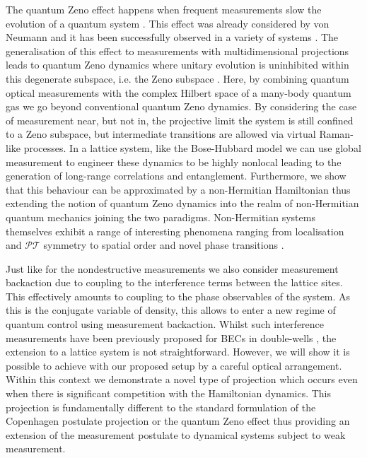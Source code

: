 The quantum Zeno effect happens when frequent measurements slow the
evolution of a quantum system \cite{misra1977, facchi2008}. This
effect was already considered by von Neumann and it has been
successfully observed in a variety of systems \cite{itano1990,
  nagels1997, kwiat1999, balzer2000, streed2006, hosten2006,
  bernu2008}. The generalisation of this effect to measurements with
multidimensional projections leads to quantum Zeno dynamics where
unitary evolution is uninhibited within this degenerate subspace,
i.e. the Zeno subspace \cite{facchi2008, raimond2010, raimond2012,
  signoles2014}. Here, by combining quantum optical measurements with
the complex Hilbert space of a many-body quantum gas we go beyond
conventional quantum Zeno dynamics. By considering the case of
measurement near, but not in, the projective limit the system is still
confined to a Zeno subspace, but intermediate transitions are allowed
via virtual Raman-like processes. In a lattice system, like the
Bose-Hubbard model we can use global measurement to engineer these
dynamics to be highly nonlocal leading to the generation of long-range
correlations and entanglement. Furthermore, we show that this
behaviour can be approximated by a non-Hermitian Hamiltonian thus
extending the notion of quantum Zeno dynamics into the realm of
non-Hermitian quantum mechanics joining the two
paradigms. Non-Hermitian systems themselves exhibit a range of
interesting phenomena ranging from localisation \cite{hatano1996,
  refael2006} and {\selectfont $\mathcal{PT}$ }
  symmetry \cite{bender1998, giorgi2010, zhang2013} to spatial order
\cite{otterbach2014} and novel phase transitions \cite{lee2014prx,
  lee2014prl}.

Just like for the nondestructive measurements we also consider
measurement backaction due to coupling to the interference terms
between the lattice sites. This effectively amounts to coupling to the
phase observables of the system. As this is the conjugate variable of
density, this allows to enter a new regime of quantum control using
measurement backaction. Whilst such interference measurements have
been previously proposed for BECs in double-wells \cite{cirac1996,
  castin1997, ruostekoski1997}, the extension to a lattice system is
not straightforward. However, we will show it is possible to achieve
with our proposed setup by a careful optical arrangement. Within this
context we demonstrate a novel type of projection which occurs even
when there is significant competition with the Hamiltonian
dynamics. This projection is fundamentally different to the standard
formulation of the Copenhagen postulate projection or the quantum Zeno
effect \cite{misra1977, facchi2008} thus providing an extension of the
measurement postulate to dynamical systems subject to weak
measurement.

